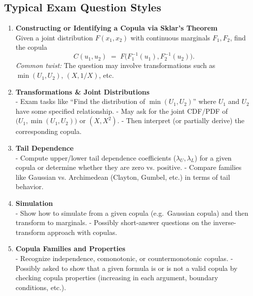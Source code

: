 \documentclass[13pt,a4paper]{article}
\begin{document}
\subsection{Typical Exam Question Styles}
\begin{enumerate}
  \item \textbf{Constructing or Identifying a Copula via Sklar’s Theorem}\\
    Given a joint distribution \(F(x_1,x_2)\) with continuous marginals \(F_1, F_2\), find the copula 
    \[
      C(u_1,u_2) \;=\; F\bigl(F_1^{-1}(u_1), F_2^{-1}(u_2)\bigr).
    \]
    \emph{Common twist:} The question may involve transformations such as \(\min(U_1,U_2)\), \((X,1/X)\), etc.

  \item \textbf{Transformations \& Joint Distributions}\\
    - Exam tasks like “Find the distribution of \(\min(U_1,U_2)\)” where \(U_1\) and \(U_2\) have some specified relationship.  
    - May ask for the joint CDF/PDF of \(\bigl(U_1, \min(U_1,U_2)\bigr)\) or \((X, X^2)\).  
    - Then interpret (or partially derive) the corresponding copula.

  \item \textbf{Tail Dependence}\\
    - Compute upper/lower tail dependence coefficients (\(\lambda_U, \lambda_L\)) for a given copula or determine whether they are zero vs. positive.  
    - Compare families like Gaussian vs. Archimedean (Clayton, Gumbel, etc.) in terms of tail behavior.

  \item \textbf{Simulation}\\
    - Show how to simulate from a given copula (e.g.\ Gaussian copula) and then transform to marginals.  
    - Possibly short-answer questions on the inverse-transform approach with copulas.

  \item \textbf{Copula Families and Properties}\\
    - Recognize independence, comonotonic, or countermonotonic copulas.  
    - Possibly asked to show that a given formula is or is not a valid copula by checking copula properties (increasing in each argument, boundary conditions, etc.).
\end{enumerate}
\end{document}
